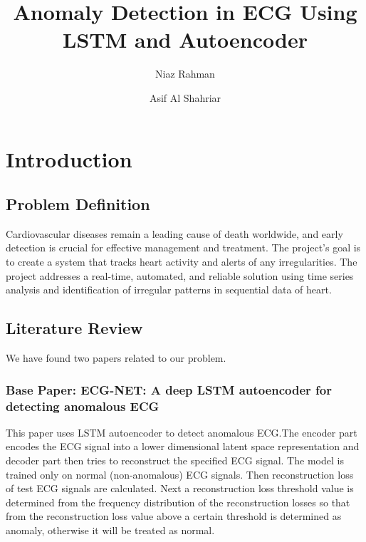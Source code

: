 \documentclass[nonacm,sigconf]{acmart}
\begin{document}
\title{Anomaly Detection in ECG Using LSTM and Autoencoder}


\author{Niaz Rahman}

\author{Asif Al Shahriar}

\maketitle

\section{Introduction}
\subsection{Problem Definition}
Cardiovascular diseases remain a leading cause of death worldwide, and early
detection is crucial for effective management and treatment. The project’s
goal is to create a system that tracks heart activity and alerts of any irregularities. The project addresses a real-time, automated, and reliable solution
using time series analysis and identification of irregular patterns in sequential
data of heart.

\subsection{Literature Review}
We have found two papers related to our problem.
\subsubsection{\textbf{Base  Paper: ECG-NET: A deep LSTM autoencoder for detecting anomalous ECG}}
This paper uses LSTM autoencoder to detect anomalous ECG.The encoder part encodes the ECG signal into a lower dimensional latent space representation and decoder part then tries to reconstruct the specified ECG signal. The model is trained only on normal (non-anomalous) ECG signals. Then reconstruction loss of test ECG signals are calculated. Next a reconstruction loss threshold value is determined from the frequency distribution of the reconstruction losses so that from the reconstruction loss value above a certain threshold is determined as anomaly, otherwise it will be treated as normal.\cite{roy2023ecg}
\end{document}
